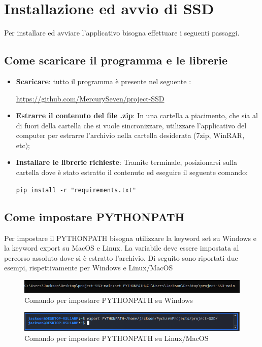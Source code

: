 \section{Installazione ed avvio di SSD}
Per installare ed avviare l'applicativo  bisogna effettuare i seguenti passaggi.
\subsection{Come scaricare il programma e le librerie}

\begin{itemize}
	\item \textbf{Scaricare}: tutto il programma è presente nel seguente :\newline{}
\centerline{\url{https://github.com/MercurySeven/project-SSD}}

	\item \textbf{Estrarre il contenuto del file .zip}: In una cartella a piacimento, che sia al di fuori della cartella che si vuole sincronizzare, utilizzare l'applicativo del computer per estrarre l'archivio nella cartella desiderata (7zip, WinRAR, etc);
	\item \textbf{Installare le librerie richieste}:
	Tramite terminale, posizionarsi sulla cartella dove è stato estratto il contenuto ed eseguire il seguente comando:\newline{}
	\centerline{\texttt{pip install -r "requirements.txt"}}
\end{itemize}
\subsection{Come impostare PYTHONPATH}
Per impostare il PYTHONPATH bisogna utilizzare la keyword set su Windows e la keyword export su MacOS e Linux. La variabile deve essere impostata al percorso assoluto dove si è estratto l'archivio.
Di seguito sono riportati due esempi, rispettivamente per Windows e Linux/MacOS
\begin{figure}[H]
    \centering
    \includegraphics[scale = 0.65]{components/img/Windows-istruzione-1.png}
    \caption{Comando per impostare PYTHONPATH su Windows}
    \label{fig:comando per impostare PYTHONPATH su windows}
\end{figure}
\begin{figure}[H]
    \centering
    \includegraphics[scale = 0.50]{components/img/linux-istruzione-1.jpg}
    \caption{ Comando per impostare PYTHONPATH su Linux/MacOS}
    \label{fig:comando per impostare PYTHONPATH su windows}
\end{figure}
